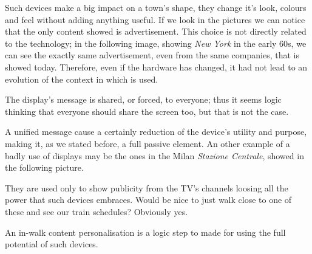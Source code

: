 \documentclass[]{usiinfbachelorproject}
\begin{document}
Such devices make a big impact on a town's shape, they change it's look, colours and feel without adding anything useful. If we look in the pictures we can notice that the only content showed is advertisement. This choice is not directly related to the technology; in the following image, showing \emph{New York} in the early 60s, we can see the exactly same advertisement, even from the same companies, that is showed today. Therefore, even if the hardware has changed, it had not lead to an evolution of the context in which is used.
\begin{figure}[H]
  \centering
\end{figure} 
The display's message is shared, or forced, to everyone; thus it seems logic thinking that everyone should share the screen too, but that is not the case.

A unified message cause a certainly reduction of the device's utility and purpose, making it, as we stated before, a full passive element. An other example of a badly use of displays may be the ones in the Milan \emph{Stazione Centrale}, showed in the following picture.
\begin{figure}[H]
  \centering
\end{figure} 
They are used only to show publicity from the TV's channels loosing all the power that such devices embraces. Would be nice to just walk close to one of these and see our train schedules? Obviously yes.

An in-walk content personalisation is a logic step to made for using the full potential of such devices.
\end{document}
